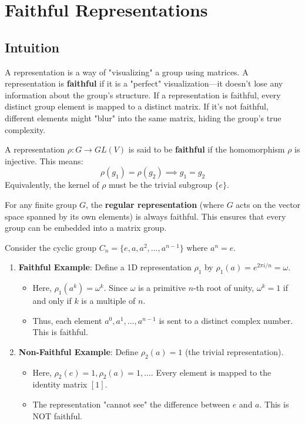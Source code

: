 \section{Faithful Representations}

\subsection{Intuition}
A representation is a way of "visualizing" a group using matrices. A representation is \textbf{faithful} if it is a "perfect" visualization—it doesn't lose any information about the group's structure. If a representation is faithful, every distinct group element is mapped to a distinct matrix. If it's not faithful, different elements might "blur" into the same matrix, hiding the group's true complexity.

\begin{definition}
A representation $\rho: G \to GL(V)$ is said to be \textbf{faithful} if the homomorphism $\rho$ is injective. This means:
\[ \rho(g_1) = \rho(g_2) \implies g_1 = g_2 \]
Equivalently, the kernel of $\rho$ must be the trivial subgroup $\{e\}$.
\end{definition}

\begin{theorem}
For any finite group $G$, the \textbf{regular representation} (where $G$ acts on the vector space spanned by its own elements) is always faithful. This ensures that every group can be embedded into a matrix group.
\end{theorem}

\begin{example}
Consider the cyclic group $C_n = \{e, a, a^2, \dots, a^{n-1}\}$ where $a^n = e$.
\begin{enumerate}
    \item \textbf{Faithful Example}: Define a 1D representation $\rho_1$ by $\rho_1(a) = e^{2\pi i / n} = \omega$.
    \begin{itemize}
        \item Here, $\rho_1(a^k) = \omega^k$. Since $\omega$ is a primitive $n$-th root of unity, $\omega^k = 1$ if and only if $k$ is a multiple of $n$.
        \item Thus, each element $a^0, a^1, \dots, a^{n-1}$ is sent to a distinct complex number. This is faithful.
    \end{itemize}
    \item \textbf{Non-Faithful Example}: Define $\rho_2(a) = 1$ (the trivial representation).
    \begin{itemize}
        \item Here, $\rho_2(e) = 1, \rho_2(a) = 1, \dots$. Every element is mapped to the identity matrix $[1]$.
        \item The representation "cannot see" the difference between $e$ and $a$. This is NOT faithful.
    \end{itemize}
\end{enumerate}
\end{example}


